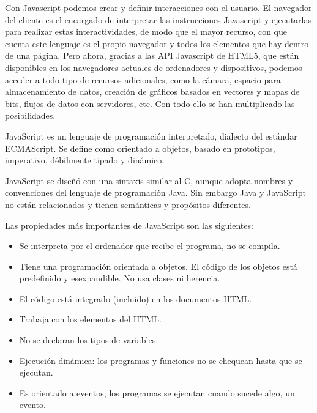 Con Javascript podemos crear y definir interacciones con el usuario. El navegador del cliente es el encargado de interpretar las instrucciones Javascript y ejecutarlas para realizar estas interactividades, de modo que el mayor recurso, con que cuenta este lenguaje es el propio navegador y todos los elementos que hay dentro de una página. Pero ahora, gracias a las API Javascript de HTML5, que están disponibles en los navegadores actuales de ordenadores y dispositivos, podemos acceder a todo tipo de recursos adicionales, como la cámara, espacio para almacenamiento de datos, creación de gráficos basados en vectores y mapas de bits, flujos de datos con servidores, etc. Con todo ello se han multiplicado las posibilidades.


JavaScript es un lenguaje de programación interpretado, dialecto del estándar ECMAScript. Se define como orientado a objetos, basado en prototipos, imperativo, débilmente tipado y dinámico.

JavaScript se diseñó con una sintaxis similar al C, aunque adopta nombres y convenciones del lenguaje de programación Java. Sin embargo Java y JavaScript no están relacionados y tienen semánticas y propósitos diferentes.

Las propiedades más importantes de JavaScript son las siguientes:
\begin{itemize}
    \item Se interpreta por el ordenador que recibe el programa, no se compila.
    \item Tiene una programación orientada a objetos. El código de los objetos está predefinido y esexpandible. No usa clases ni herencia.
    \item El código está integrado (incluido) en los documentos HTML.
    \item Trabaja con los elementos del HTML.
    \item No se declaran los tipos de variables.
    \item Ejecución dinámica: los programas y funciones no se chequean hasta que se ejecutan.
    \item Es orientado a eventos, los programas se ejecutan cuando sucede algo, un evento.
\end{itemize}

